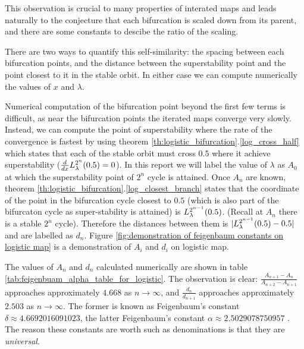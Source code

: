  This observation is crucial to many properties of interated maps and leads naturally to the conjecture that each bifurcation is scaled down from its parent, and there are some constants to descibe the ratio of the scaling. 

 There are two ways to quantify this self-similarity: the spacing between each bifurcation points, and the distance between the superstability point and the point closest to it in the stable orbit. 
 In either case we can compute numerically the values of $x$ and $\lambda$.

 Numerical computation of the bifurcation point beyond the first few terms is difficult, as near the bifurcation points the iterated maps converge very slowly.
 Instead, we can compute the point of superstability where the rate of the convergence is fastest by using theorem \ref{th:logistic_bifurcation}.\ref{log_cross_half} which states that each of the stable orbit must cross $0.5$ where it achieve superstability ($\frac{d}{dx}L_{\lambda}^{2^n}(0.5) = 0$).
In this report we will label the value of $\lambda$ as $A_0$ at which the superstability point of $2^n$ cycle is attained.
Once $A_n$ are known, theorem \ref{th:logistic_bifurcation}.\ref{log_closest_branch} states that the coordinate of the point in the bifurcation cycle closest to $0.5$ (which is also part of the bifurcaton cycle as super-stability is attained) is $L_{\lambda}^{2^{n-1}}(0.5)$. (Recall at $A_n$ there is a stable $2^n$ cycle).
Therefore the distances between them is $|L_{\lambda}^{2^{n-1}}(0.5) - 0.5|$ and are labelled as $d_n$.
Figure \ref{fig:demonstration of feigenbaum constants on logistic map} is a demonstration of $A_i$ and $d_i$ on logistic map.

The values of $A_n$ and $d_n$ calculated numerically are shown in table \ref{tab:feigenbuam_alpha_table_for_logistic}. 
The observation is clear:
$\frac{A_{n+1}-A_n}{A_{n+2}-A_{n+1}}$ approaches approximately $4.668$ as $n \rightarrow \infty$, and $\frac{d_n}{d_{n+1}}$ approaches approximately $2.503$ as $n \rightarrow \infty$. 
The former is known as Feigenbaum's constant $\delta \approx 4.6692016091023$, the latter Feigenbaum's constant $\alpha \approx 2.5029078750957$ \cite{F1}.
The reason these constants are worth such as denominations is that they are \emph{universal}.

